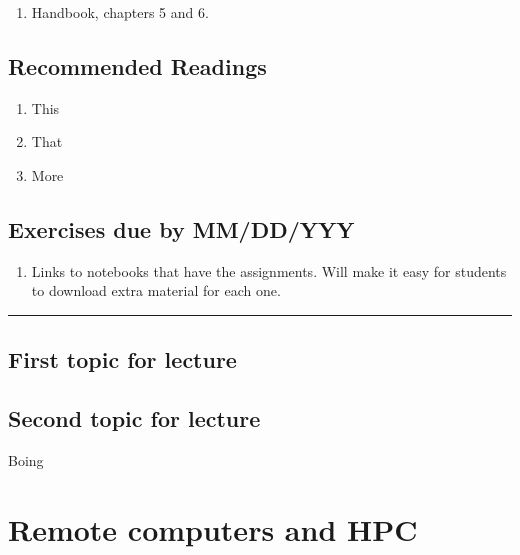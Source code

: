 \documentclass[]{book}
\providecommand{\tightlist}{%
  \setlength{\itemsep}{0pt}\setlength{\parskip}{0pt}}
\begin{document}
\begin{enumerate}
\def\labelenumi{\arabic{enumi}.}
\tightlist
\item
  Handbook, chapters 5 and 6.
\end{enumerate}

\hypertarget{recommended-readings-3}{%
\section*{Recommended Readings}\label{recommended-readings-3}}

\begin{enumerate}
\def\labelenumi{\arabic{enumi}.}
\tightlist
\item
  This
\item
  That
\item
  More
\end{enumerate}

\hypertarget{exercises-due-by-mmddyyy-3}{%
\section*{Exercises due by MM/DD/YYY}\label{exercises-due-by-mmddyyy-3}}

\begin{enumerate}
\def\labelenumi{\arabic{enumi}.}
\tightlist
\item
  Links to notebooks that have the assignments. Will make it
  easy for students to download extra material for each one.
\end{enumerate}

\begin{center}\rule{0.5\linewidth}{\linethickness}\end{center}

\hypertarget{first-topic-for-lecture-3}{%
\section{First topic for lecture}\label{first-topic-for-lecture-3}}

\hypertarget{second-topic-for-lecture-3}{%
\section{Second topic for lecture}\label{second-topic-for-lecture-3}}

Boing

\hypertarget{remote-computers-and-hpc}{%
\chapter{Remote computers and HPC}\label{remote-computers-and-hpc}}
\end{document}
